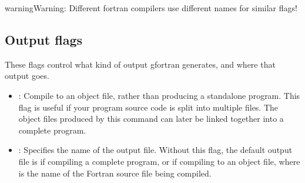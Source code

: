 \documentclass[letterpaper,10pt,english]{sphinxmanual}
\begin{document}
\begin{notice}{warning}{Warning:}
Different fortran compilers use different names for similar flags!
\end{notice}


\subsection{Output flags}
\label{gfortran_flags:output-flags}
These flags control what kind of output gfortran generates, and where
that output goes.
\begin{itemize}
\item {} 
: Compile to an object file, rather than producing a
standalone program.  This flag is useful if your program source
code is split into multiple files.  The object files produced by
this command can later be linked together into a complete program.

\item {} 
: Specifies the name of the output file.  Without
this flag, the default output file is  if compiling a
complete program, or  if compiling to an object
file, where  is the name of the Fortran source
file being compiled.

\end{itemize}
\end{document}
